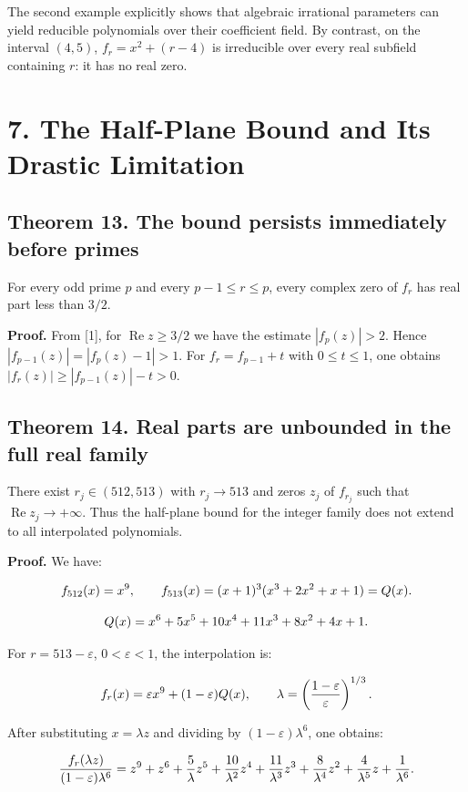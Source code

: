 \documentclass[11pt,a4paper]{article}
\newcommand{\fitmath}[1]{\begingroup\setbox0=\hbox{$\displaystyle #1$}\ifdim\wd0>\linewidth\resizebox{\linewidth}{!}{\box0}\else\box0\fi\endgroup}
\begin{document}
The second example explicitly shows that algebraic irrational parameters can yield reducible polynomials over their coefficient field. By contrast, on the interval $(4,5)$, $f_r=x^2+(r-4)$ is irreducible over every real subfield containing $r$: it has no real zero.


\section*{7. The Half-Plane Bound and Its Drastic Limitation}

\subsection*{Theorem 13. The bound persists immediately before primes}

For every odd prime $p$ and every $p-1\leq r\leq p$, every complex zero of $f_r$ has real part less than $3/2$.


\textbf{Proof.} From [1], for $\operatorname{Re}z\geq3/2$ we have the estimate $|f_p(z)|>2$. Hence $|f_{p-1}(z)|=|f_p(z)-1|>1$. For $f_r=f_{p-1}+t$ with $0\leq t\leq1$, one obtains $|f_r(z)|\geq|f_{p-1}(z)|-t>0$.


\subsection*{Theorem 14. Real parts are unbounded in the full real family}

There exist $r_j\in(512,513)$ with $r_j\to513$ and zeros $z_j$ of $f_{r_j}$ such that $\operatorname{Re}z_j\to+\infty$. Thus the half-plane bound for the integer family does not extend to all interpolated polynomials.


\textbf{Proof.} We have:


\[
\fitmath{f_{512}(x)=x^9,\qquad f_{513}(x)=(x+1)^3(x^3+2x^2+x+1)=Q(x).}
\]


\[
\fitmath{Q(x)=x^6+5x^5+10x^4+11x^3+8x^2+4x+1.}
\]


For $r=513-\varepsilon$, $0<\varepsilon<1$, the interpolation is:


\[
\fitmath{f_r(x)=\varepsilon x^9+(1-\varepsilon)Q(x),\qquad \lambda=\left(\frac{1-\varepsilon}{\varepsilon}\right)^{1/3}.}
\]


After substituting $x=\lambda z$ and dividing by $(1-\varepsilon)\lambda^6$, one obtains:


\[
\fitmath{\frac{f_r(\lambda z)}{(1-\varepsilon)\lambda^6}=z^9+z^6+\frac5\lambda z^5+\frac{10}{\lambda^2}z^4+\frac{11}{\lambda^3}z^3+\frac8{\lambda^4}z^2+\frac4{\lambda^5}z+\frac1{\lambda^6}.}
\]
\end{document}
